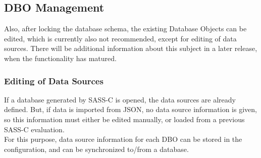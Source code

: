 \subsection{DBO Management}

Also, after locking the database schema, the existing Database Objects can be edited, which is currently also not recommended, except for editing of data sources. There will be additional information about this subject in a later release, when the functionality has matured.

\subsubsection{Editing of Data Sources}
\label{sec:data_source_editing}

If a database generated by SASS-C is opened, the data sources are already defined. But, if data is imported from JSON, no data source information is given, so this information must either be edited manually, or loaded from a previous SASS-C evaluation. \\

For this purpose, data source information for each DBO can be stored in the configuration, and can be synchronized to/from a database. \\

